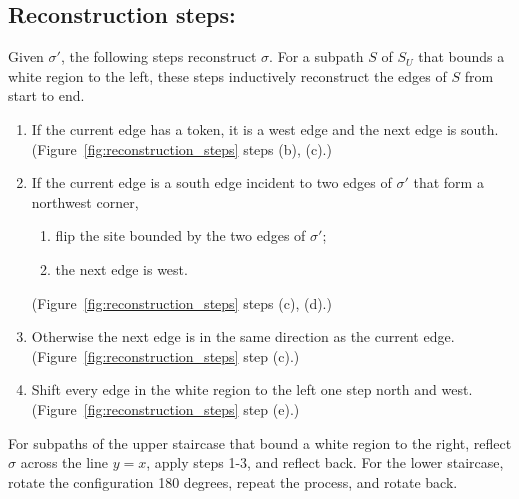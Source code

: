 \documentclass[letterpaper,english,numberwithinsect]{amsart}
\begin{document}
\subsection*{Reconstruction steps:}\label{appendix_reconstruction_steps}

Given $\sigma'$, the following steps reconstruct $\sigma$.
For a subpath $S$ of $S_U$ that bounds a white region to the left,
these steps inductively reconstruct the edges of $S$ from start to end. 
\begin{enumerate}
\item If the current edge has a token, it is a west edge and the next edge is south. 
(Figure~\ref{fig:reconstruction_steps} steps (b), (c).)
\item If the current edge is a south edge incident to two edges of $\sigma'$ that form a northwest corner, 
  \begin{enumerate}
  \item flip the site bounded by the two edges of $\sigma'$;
  \item the next edge is west. 
  \end{enumerate}
(Figure~\ref{fig:reconstruction_steps} steps (c), (d).)
\item Otherwise the next edge is in the same direction as the current edge.
(Figure~\ref{fig:reconstruction_steps} step (c).)
\item Shift every edge in the white region to the left one step north and west.
(Figure~\ref{fig:reconstruction_steps} step (e).)
\end{enumerate}
For subpaths of the upper staircase that bound a white region to the right, reflect $\sigma$ across the line $y=x$, apply steps 1-3, and reflect back. For the lower staircase, rotate the configuration 180 degrees, repeat the process, and rotate back.
\end{document}
